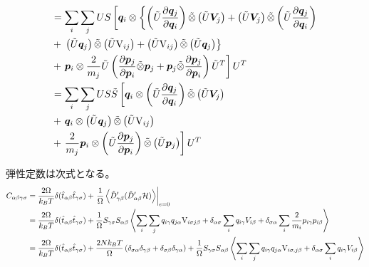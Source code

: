 \documentclass[11pt,a4paper,uplatex]{jsarticle}
\begin{document}
\begin{align}
    &= \sum_{i}\sum_{j} U S \left[
                \bm{q}_{i} \otimes \left\{ 
                     \left( \tilde{U} \frac{\partial \bm{q}_{j}}{\partial \bm{q}_{i}} \right) \tilde{\otimes} \left( \tilde{U} \bm{V}_{j} \right)
                    + \left( \tilde{U}\bm{V}_{j} \right) \tilde{\otimes} \left( \tilde{U} \frac{\partial \bm{q}_{j}}{\partial \bm{q}_{i}} \right)
                   \right. \right. \\
    &+ \left. \left. 
          \left( \tilde{U} \bm{q}_{j} \right) \tilde{\otimes} \left( \tilde{U} {\rm V}_{ij} \right) 
        + \left( \tilde{U} {\rm V}_{ij} \right) \tilde{\otimes} \left( \tilde{U} \bm{q}_{j} \right) 
       \right\} \right. \\
    &+ \left. \bm{p}_{i} \otimes \frac{2}{m_{j}} \tilde{U}  \left( 
                \frac{\partial \bm{p}_{j}} {\partial \bm{p}_{i}} \tilde{\otimes} \bm{p}_{j} 
                + \bm{p}_{j}  \tilde{\otimes} \frac{\partial \bm{p}_{j}} {\partial \bm{p}_{i}}
                 \right) \tilde{U}^{T}
               \right] U^{T} \\
 &= \sum_{i} \sum_{j} U S \tilde{S} \left[
       \bm{q}_{i} \otimes \left(\tilde{U} \frac{\partial \bm{q}_{j}}{\partial \bm{q}_{i}}\right) \tilde{\otimes} \left( \tilde{U} \bm{V}_{j} \right) \right. \\
      &+ \left. \bm{q}_{i} \otimes \left( \tilde{U} \bm{q}_{j} \right) \tilde{\otimes} \left( \tilde{U} {\rm V}_{ij} \right) \right. \\
      &+ \left. \frac{2}{m_{j}} \bm{p}_{i} \otimes  \left(  \tilde{U} 
        \frac{\partial \bm{p}_{j}} {\partial \bm{p}_{i}} \right) \tilde{\otimes} \left( \tilde{U} \bm{p}_{j} \right) 
      \right] U^{T}
\end{align}

弾性定数は次式となる。
\begin{align}
    C_{\alpha \beta \gamma \sigma} &= \frac{2\Omega}{k_{B}T} \delta(\hat{t}_{\alpha \beta} \hat{t}_{\gamma \sigma}) 
    +  \left.\frac{1}{\Omega} \left<\hat{D}_{\gamma \beta}'(\hat{D}_{\alpha \beta}' {\cal H})\right>\right|_{e=0}  \\
    &= \frac{2\Omega}{k_{B}T} \delta(\hat{t}_{\alpha \beta} \hat{t}_{\gamma \sigma}) 
    + \frac{1}{\Omega} S_{\gamma \sigma} S_{\alpha \beta} \left<
    \sum_{i} \sum_{j} q_{i \gamma} q_{j \alpha} {\rm V}_{i\sigma j\beta}
     + \delta_{\alpha \sigma}  \sum_{i} q_{i \gamma}V_{i \beta}
      + \delta_{\sigma \alpha} \sum_{i} \frac{2}{m_{i}} p_{i \gamma} p_{i \beta}
    \right> \\
    &= \frac{2\Omega}{k_{B}T} \delta(\hat{t}_{\alpha \beta} \hat{t}_{\gamma \sigma}) 
      + \frac{2 N k_{B} T}{\Omega} \left( \delta_{\sigma \alpha}  \delta_{\gamma \beta} + \delta_{\sigma \beta}  \delta_{\gamma \alpha} \right)
      + \frac{1}{\Omega} S_{\gamma \sigma} S_{\alpha \beta} \left<
    \sum_{i} \sum_{j} q_{i \gamma} q_{j \alpha} {\rm V}_{i\sigma, j\beta}
     + \delta_{\alpha \sigma}  \sum_{i} q_{i \gamma}V_{i \beta}
    \right>
\end{align}
\end{document}

